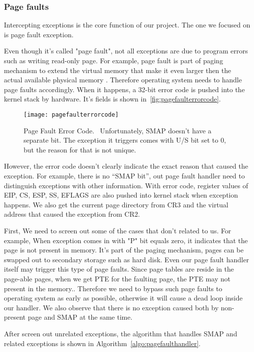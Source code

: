 \subsubsection{Page faults}
Intercepting exceptions is the core function of our project. The one we focused on is page fault exception.

Even though it's called "page fault", not all exceptions are due to program errors such as writing read-only page. For example, page fault is part of paging mechanism to extend the virtual memory that make it even larger then the actual available physical memory . Therefore operating system needs to handle page faults accordingly. When it happens, a 32-bit error code is pushed into the kernel stack by hardware. It's fields is shown in~\autoref{fig:pagefaulterrorcode}.


\begin{figure}[th]
  \texttt{[image: pagefaulterrorcode]}
  \centering
  \caption{Page Fault Error Code.~\cite{intelinterrupt} Unfortunately, SMAP doesn't have a separate bit. The exception it triggers comes with U/S bit set to 0, but the reason for that is not unique.}
  \label{fig:pagefaulterrorcode}
\end{figure}

However, the error code doesn't clearly indicate the exact reason that caused the exception. For example, there is no “SMAP bit”, out page fault handler need to distinguish exceptions with other information. With error code, register values of EIP, CS, ESP, SS, EFLAGS are also pushed into kernel stack when exception happens. We also get the current page directory from CR3 and the virtual address that caused the exception from CR2.

First, We need to screen out some of the cases that don't related to us. For example, When exception comes in with "P" bit equals zero, it indicates that the page is not present in memory. It's part of the paging mechanism, pages can be swapped out to secondary storage such as hard disk. Even our page fault handler itself may trigger this type of page faults. Since page tables are reside in the page-able pages, when we get PTE for the faulting page, the PTE may not present in the memory.. Therefore we need to bypass such page faults to operating system as early as possible, otherwise it will cause a dead loop inside our handler. We also observe that there is no exception caused both by non-present page and SMAP at the same time.


After screen out unrelated exceptions, the algorithm that handles SMAP and related exceptions is shown in Algorithm~\ref{algo:pagefaulthandler}.


